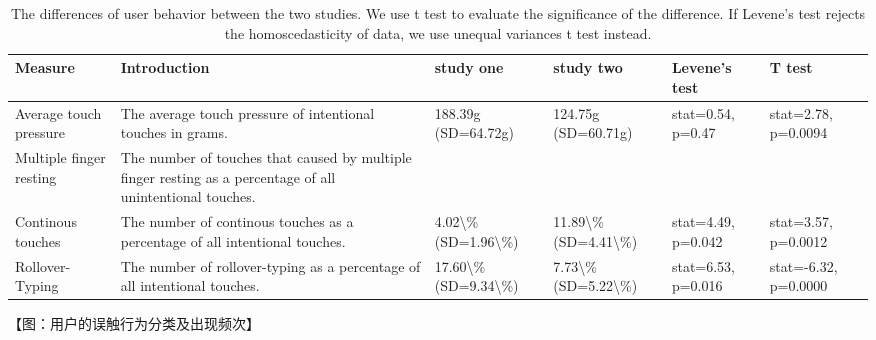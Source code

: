 \begin{table}[htbp]
  \centering
  \caption{The differences of user behavior between the two studies. We use t test to evaluate the significance of the difference. If Levene's test rejects the homoscedasticity of data, we use unequal variances t test instead.}
    \begin{tabular}{|p{6em}|p{14.835em}|p{5.585em}|p{5.585em}|p{4.665em}|p{4.835em}|}
    \toprule
    Measure & Introduction & study one & study two & Levene's test & T test \\
    \midrule
    Average touch pressure & The average touch pressure of intentional touches in grams. & 188.39g (SD=64.72g) & 124.75g (SD=60.71g) & stat=0.54, p=0.47 & stat=2.78, p=0.0094 \\
    \midrule
    Multiple finger resting & The number of touches that caused by multiple finger resting as a percentage of all unintentional touches. & \multicolumn{1}{r|}{} & \multicolumn{1}{r|}{} & \multicolumn{1}{r|}{} & \multicolumn{1}{r|}{} \\
    \midrule
    Continous touches & The number of continous touches as a percentage of all intentional touches. & 4.02\textbackslash{}\% (SD=1.96\textbackslash{}\%) & 11.89\textbackslash{}\% (SD=4.41\textbackslash{}\%) & stat=4.49, p=0.042 & stat=3.57, p=0.0012 \\
    \midrule
    Rollover-Typing & The number of rollover-typing as a percentage of all intentional touches. & 17.60\textbackslash{}\% (SD=9.34\textbackslash{}\%) & 7.73\textbackslash{}\% (SD=5.22\textbackslash{}\%) & stat=6.53, p=0.016 & stat=-6.32, p=0.0000 \\
    \bottomrule
    \end{tabular}%
  \label{tab:addlabel}%
\end{table}%


【图：用户的误触行为分类及出现频次】


